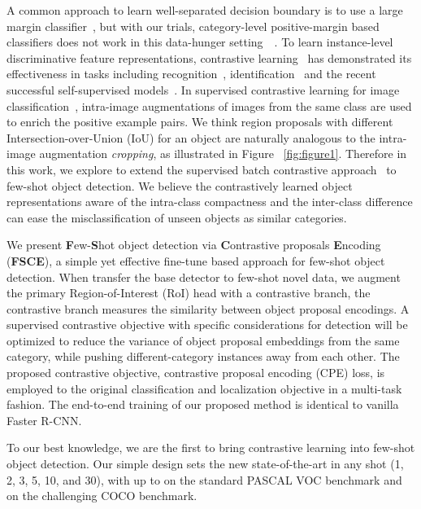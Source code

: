 \documentclass[final]{cvpr}
\begin{document}
A common approach to learn well-separated decision boundary is to use a large margin classifier~\cite{large_margin}, but with our trials, category-level positive-margin based classifiers does not work in this data-hunger setting~~\cite{cos_face,deng2009imagenet}. To learn instance-level discriminative feature representations, contrastive learning~\cite{hadsell2006dimensionality,1467314} has demonstrated its effectiveness in tasks including recognition~\cite{schroff2015facenet}, identification~\cite{sun2014deep} and the recent successful self-supervised models~\cite{wu_unsupervised_2018,xie2020delving,he_momentum_2020,chen_simple_2020}. In supervised contrastive learning for image classification~\cite{supervised_contrastive_learning}, intra-image augmentations of images from the same class are used to enrich the positive example pairs. We think region proposals with different Intersection-over-Union (IoU) for an object are naturally analogous to the intra-image augmentation \textit{cropping}, as illustrated in Figure ~\ref{fig:figure1}. Therefore in this work, we explore to extend the supervised batch contrastive approach~\cite{supervised_contrastive_learning} to few-shot object detection. We believe the contrastively learned object representations aware of the intra-class compactness and the inter-class difference can ease the misclassification of unseen objects as similar categories.

We present \textbf{F}ew-\textbf{S}hot object detection via \textbf{C}ontrastive proposals \textbf{E}ncoding (\textbf{FSCE}), a simple yet effective fine-tune based approach for few-shot object detection. When transfer the base detector to few-shot novel data, we augment the primary Region-of-Interest (RoI) head with a contrastive branch, the contrastive branch measures the similarity between object proposal encodings. A supervised contrastive objective with specific considerations for detection will be optimized to reduce the variance of object proposal embeddings from the same category, while pushing different-category instances away from each other. The proposed contrastive objective, contrastive proposal encoding (CPE) loss, is employed to the original classification and localization objective in a multi-task fashion. The end-to-end training of our proposed method is identical to vanilla Faster R-CNN. 

To our best knowledge, we are the first to bring contrastive learning into few-shot object detection. Our simple design sets the new state-of-the-art in any shot (1, 2, 3, 5, 10, and 30), with up to  on the standard PASCAL VOC benchmark and  on the challenging COCO benchmark.
\end{document}
